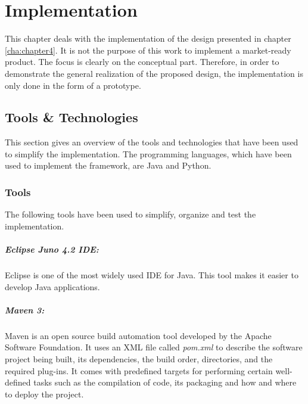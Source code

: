 \chapter{Implementation\label{cha:chapter5}}
This chapter deals with the implementation of the design presented in chapter \ref{cha:chapter4}. It is not the purpose of this work to implement a market-ready product. The focus is clearly on the conceptual part. Therefore, in order to demonstrate the general realization of the proposed design, the implementation is only done in the form of a prototype.



\section{Tools \& Technologies\label{sec:impl_tools_tech}}	
This section gives an overview of the tools and technologies that have been used to simplify the implementation. The programming languages, which have been used to implement the framework, are Java and Python.

\subsection{Tools\label{sec:impl_tools}}
The following tools have been used to simplify, organize and test the implementation.

\paragraph{Eclipse Juno 4.2 IDE:\label{sec:impl_eclipse}} Eclipse is one of the most widely used IDE for Java. This tool makes it easier to develop Java applications. 

\paragraph{Maven 3:\label{sec:impl_maven}} Maven is an open source build automation tool developed by the Apache Software Foundation. It uses an \ac{XML} file called \textit{pom.xml} to describe the software project being built, its dependencies, the build order, directories, and the required plug-ins. It comes with predefined targets for performing certain well-defined tasks such as the compilation of code, its packaging and how and where to deploy the project.


